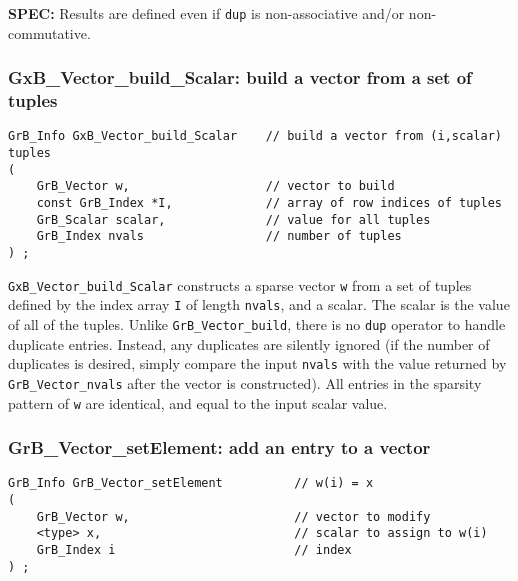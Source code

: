 \documentclass[12pt]{article}
\begin{document}
\begin{alert}
{\bf SPEC:} Results are defined even if \verb'dup' is non-associative and/or
non-commutative.
\end{alert}

\subsubsection{{\sf GxB\_Vector\_build\_Scalar:} build a vector from a set of tuples}
\label{vector_build_Scalar}

\begin{mdframed}[userdefinedwidth=6in]
{\footnotesize
\begin{verbatim}
GrB_Info GxB_Vector_build_Scalar    // build a vector from (i,scalar) tuples
(
    GrB_Vector w,                   // vector to build
    const GrB_Index *I,             // array of row indices of tuples
    GrB_Scalar scalar,              // value for all tuples
    GrB_Index nvals                 // number of tuples
) ;
\end{verbatim} } \end{mdframed}

\verb'GxB_Vector_build_Scalar' constructs a sparse vector \verb'w' from a set
of tuples defined by the index array \verb'I' of length \verb'nvals', and a
scalar.  The scalar is the value of all of the tuples.  Unlike
\verb'GrB_Vector_build', there is no \verb'dup' operator to handle duplicate
entries.  Instead, any duplicates are silently ignored (if the number of
duplicates is desired, simply compare the input \verb'nvals' with the value
returned by \verb'GrB_Vector_nvals' after the vector is constructed).  All
entries in the sparsity pattern of \verb'w' are identical, and equal to the
input scalar value.

\subsubsection{{\sf GrB\_Vector\_setElement:}    add an entry to a vector}
\label{vector_setElement}

\begin{mdframed}[userdefinedwidth=6in]
{\footnotesize
\begin{verbatim}
GrB_Info GrB_Vector_setElement          // w(i) = x
(
    GrB_Vector w,                       // vector to modify
    <type> x,                           // scalar to assign to w(i)
    GrB_Index i                         // index
) ;
\end{verbatim} } \end{mdframed}
\end{document}
